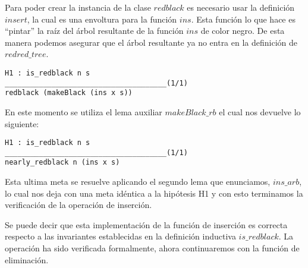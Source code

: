 Para poder crear la instancia de la clase \hyperref[class_rb]{$redblack$} es necesario usar la 
definici\'on \hyperref[raiz_negra_func]{$insert$}, la cual es una envoltura para la funci\'on 
\hyperref[func_ins]{$ins$}. Esta funci\'on lo que hace es ``pintar'' la ra\'iz del \'arbol 
resultante de la funci\'on \hyperref[func_ins]{$ins$} de color negro. De esta manera podemos 
asegurar que el \'arbol resultante ya no entra en la definici\'on de 
\hyperref[inductive_isRedB]{$redred\_tree$}.

\begin{verbatim}
H1 : is_redblack n s
______________________________________(1/1)
redblack (makeBlack (ins x s))
\end{verbatim}

En este momento se utiliza el lema auxiliar \hyperref[lema_3]{$makeBlack\_rb$} el cual nos devuelve 
lo siguiente:

\begin{verbatim}
H1 : is_redblack n s
______________________________________(1/1)
nearly_redblack n (ins x s)
\end{verbatim}

Esta ultima meta se resuelve aplicando el segundo lema que enunciamos, 
\hyperref[lema_2]{$ins\_arb$}, lo cual nos deja con una meta idéntica a la hipótesis H1 y con esto 
terminamos la verificaci\'on de la operaci\'on de inserci\'on.

Se puede decir que esta implementaci\'on de la funci\'on de inserci\'on es correcta respecto a las 
invariantes establecidas en la definici\'on inductiva \hyperref[inductive_isRedB]{$is\_redblack$}. 
La operaci\'on  ha sido verificada formalmente, ahora continuaremos con la funci\'on de 
eliminaci\'on.
